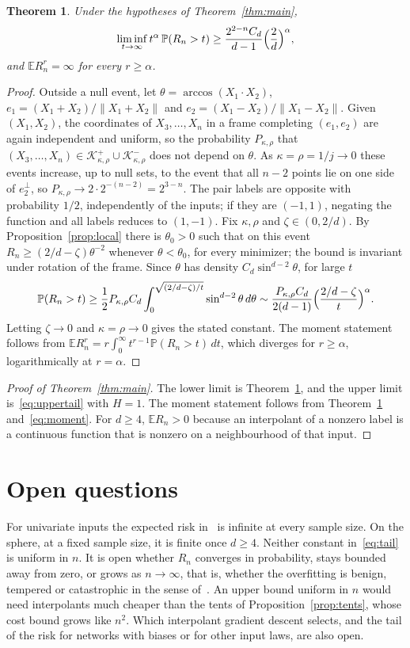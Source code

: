 \documentclass[11pt]{amsart}
\newtheorem{theorem}{Theorem}[section]
\theoremstyle{remark}
\numberwithin{equation}{section}
\newcommand{\EE}{\mathbb{E}}
\newcommand{\PP}{\mathbb{P}}
\begin{document}
\begin{theorem}\label{thm:lower}
Under the hypotheses of Theorem~\ref{thm:main},
\[
\liminf_{t\to\infty}t^{\alpha}\,\PP(R_n>t)\ge\frac{2^{2-n}C_d}{d-1}\Bigl(\frac2d\Bigr)^{\alpha},
\]
and $\EE R_n^r=\infty$ for every $r\ge\alpha$.
\end{theorem}
\begin{proof}
Outside a null event, let $\theta=\arccos(X_1\cdot X_2)$, $e_1=(X_1+X_2)/\|X_1+X_2\|$ and $e_2=(X_1-X_2)/\|X_1-X_2\|$. Given $(X_1,X_2)$, the coordinates of $X_3,\dots,X_n$ in a frame completing $(e_1,e_2)$ are again independent and uniform, so the probability $P_{\kappa,\rho}$ that $(X_3,\dots,X_n)\in\mathcal K^+_{\kappa,\rho}\cup\mathcal K^-_{\kappa,\rho}$ does not depend on $\theta$. As $\kappa=\rho=1/j\to0$ these events increase, up to null sets, to the event that all $n-2$ points lie on one side of $e_2^\perp$, so $P_{\kappa,\rho}\to2\cdot2^{-(n-2)}=2^{3-n}$. The pair labels are opposite with probability $1/2$, independently of the inputs; if they are $(-1,1)$, negating the function and all labels reduces to $(1,-1)$. Fix $\kappa,\rho$ and $\zeta\in(0,2/d)$. By Proposition~\ref{prop:local} there is $\theta_0>0$ such that on this event $R_n\ge(2/d-\zeta)\theta^{-2}$ whenever $\theta<\theta_0$, for every minimizer; the bound is invariant under rotation of the frame. Since $\theta$ has density $C_d\sin^{d-2}\theta$, for large $t$
\[
\PP(R_n>t)\ge\frac12P_{\kappa,\rho}C_d\int_0^{\sqrt{(2/d-\zeta)/t}}\sin^{d-2}\theta\,d\theta\sim\frac{P_{\kappa,\rho}C_d}{2(d-1)}\Bigl(\frac{2/d-\zeta}t\Bigr)^{\alpha}.
\]
Letting $\zeta\to0$ and $\kappa=\rho\to0$ gives the stated constant. The moment statement follows from $\EE R_n^r=r\int_0^\infty t^{r-1}\PP(R_n>t)\,dt$, which diverges for $r\ge\alpha$, logarithmically at $r=\alpha$.
\end{proof}

\begin{proof}[Proof of Theorem~\ref{thm:main}]
The lower limit is Theorem~\ref{thm:lower}, and the upper limit is~\eqref{eq:uppertail} with $H=1$. The moment statement follows from Theorem~\ref{thm:lower} and~\eqref{eq:moment}. For $d\ge4$, $\EE R_n>0$ because an interpolant of a nonzero label is a continuous function that is nonzero on a neighbourhood of that input.
\end{proof}

\section{Open questions}\label{sec:discussion}
For univariate inputs the expected risk in~\cite{JVS} is infinite at every sample size. On the sphere, at a fixed sample size, it is finite once $d\ge4$. Neither constant in~\eqref{eq:tail} is uniform in $n$. It is open whether $R_n$ converges in probability, stays bounded away from zero, or grows as $n\to\infty$, that is, whether the overfitting is benign, tempered or catastrophic in the sense of~\cite{MSAPBN}. An upper bound uniform in $n$ would need interpolants much cheaper than the tents of Proposition~\ref{prop:tents}, whose cost bound grows like $n^2$. Which interpolant gradient descent selects, and the tail of the risk for networks with biases or for other input laws, are also open.
\end{document}
